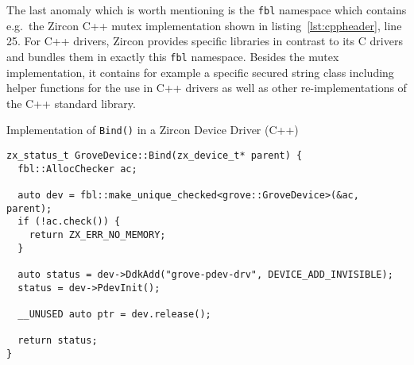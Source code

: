 The last anomaly which is worth mentioning is the \texttt{fbl} namespace which contains e.g.\ the Zircon C++ mutex implementation shown in listing~\ref{lst:cppheader}, line 25.
For C++ drivers, Zircon provides specific libraries in contrast to its C drivers and bundles them in exactly this \texttt{fbl} namespace.
Besides the mutex implementation, it contains for example a specific secured string class including helper functions for the use in C++ drivers as well as other re-implementations of the C++ standard library.
%
\begin{listing} [H]
    \caption{Implementation of \texttt{Bind()} in a Zircon Device Driver (C++)}
\label{lst:cppbind}
\begin{verbatim}
zx_status_t GroveDevice::Bind(zx_device_t* parent) {
  fbl::AllocChecker ac;

  auto dev = fbl::make_unique_checked<grove::GroveDevice>(&ac, parent);
  if (!ac.check()) {
    return ZX_ERR_NO_MEMORY;
  }

  auto status = dev->DdkAdd("grove-pdev-drv", DEVICE_ADD_INVISIBLE);
  status = dev->PdevInit();

  __UNUSED auto ptr = dev.release();

  return status;
}
\end{verbatim}
\end{listing}
%
%
